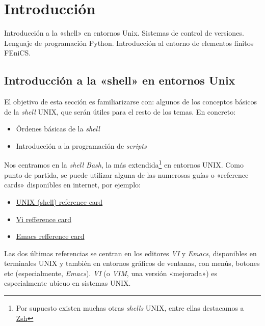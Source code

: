 
\section{Introducción}

\begin{contenidos}
  Introducción a la «shell» en entornos Unix. Sistemas
  de control de versiones. Lenguaje de programación
  Python. Introducción al entorno de elementos finitos
  FEniCS.
\end{contenidos}

\subsection{Introducción a la «shell» en entornos Unix}
\label{sec:intr-la-shell}

El objetivo de esta sección es familiarizarse con: algunos de los
conceptos básicos de la \textit{shell} UNIX, que serán útiles para el
resto de los temas. En concreto:
\begin{itemize}
\item Órdenes básicas de la \textit{shell}
\item Introducción a la programación de \textit{scripts}
\end{itemize}

Nos centramos en la \textit{shell Bash}, la más extendida\footnote{Por
  supuesto existen muchas otras \textit{shells} UNIX, entre ellas
  destacamos a \href{https://www.zsh.org/}{Zsh}} en entornos
UNIX. Como punto de partida, se puede utilizar alguna de las numerosas
guías o «reference cards» disponibles en internet, por ejemplo:
\begin{itemize}
\item \href{https://www.cs.jhu.edu/~joanne/unixRC.pdf}{UNIX (shell) reference card}
\item \href{http://web.mit.edu/merolish/Public/vi-ref.pdf}{Vi refference card}
\item \href{https://www.gnu.org/software/emacs/refcards/pdf/refcard.pdf}{Emacs refference card}
\end{itemize}

Las dos últimas referencias se centran en los editores \textit{VI} y
\textit{Emacs}, disponibles en terminales UNIX y también en entornos
gráficos de ventanas, con menús, botones etc (especialmente,
\textit{Emacs}). \textit{VI} (o \textit{VIM}, una versión «mejorada»)
es especialmente ubicuo en sistemas UNIX.

